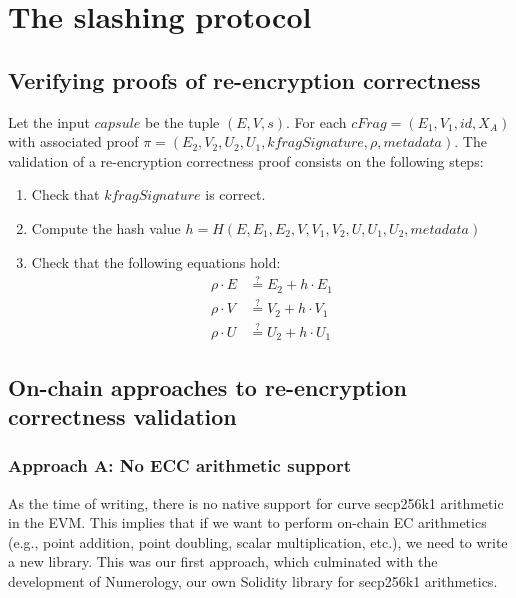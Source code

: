 
\section{The slashing protocol}
\subsection{Verifying proofs of re-encryption correctness}

Let the input $capsule$ be the tuple $(E,V,s)$. For each $cFrag = (E_1, V_1, id, X_A)$ with associated proof $\pi = (E_2, V_2, U_2, U_1, kfragSignature, \rho, metadata)$.
The validation of a re-encryption correctness proof consists on the following steps:
 \begin{enumerate}
    \item Check that $kfragSignature$ is correct. 
    \item Compute the hash value $h = H(E, E_1, E_2, V, V_1, V_2, U, U_1, U_2, metadata)$
    \item Check that the following equations hold:
    \begin{align} 
\rho \cdot E &\stackrel{?}{=} E_2 + h \cdot E_1  			\label{eq:proof-e} \\ 
\rho \cdot V &\stackrel{?}{=} V_2 + h \cdot V_1 			\label{eq:proof-v} \\
\rho \cdot U &\stackrel{?}{=} U_2 + h \cdot U_1				\label{eq:proof-u}
\end{align}
 \end{enumerate}

\subsection{On-chain approaches to re-encryption correctness validation}

\subsubsection{Approach A: No ECC arithmetic support}

As the time of writing, there is no native support for curve \textsf{secp256k1} arithmetic in the EVM. 
This implies that if we want to perform on-chain EC arithmetics (e.g., point addition, point doubling, scalar multiplication, etc.), we need to write a new library. This was our first approach, which culminated with the development of Numerology, our own Solidity library for \textsf{secp256k1} arithmetics. 

